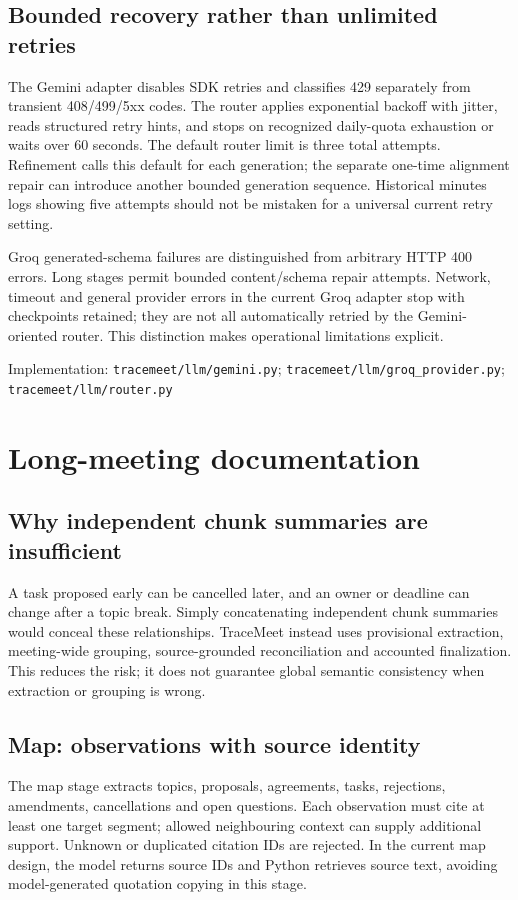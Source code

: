 \documentclass[11pt,a4paper]{article}
\newcommand{\code}[1]{\nolinkurl{#1}}
\newcommand{\src}[1]{\par{\footnotesize\raggedright\textcolor{accent}{Implementation:} #1\par}}
\begin{document}
\subsection{Bounded recovery rather than unlimited retries}
The Gemini adapter disables SDK retries and classifies 429 separately from transient 408/499/5xx codes. The router applies exponential backoff with jitter, reads structured retry hints, and stops on recognized daily-quota exhaustion or waits over 60 seconds. The default router limit is three total attempts. Refinement calls this default for each generation; the separate one-time alignment repair can introduce another bounded generation sequence. Historical minutes logs showing five attempts should not be mistaken for a universal current retry setting.

Groq generated-schema failures are distinguished from arbitrary HTTP 400 errors. Long stages permit bounded content/schema repair attempts. Network, timeout and general provider errors in the current Groq adapter stop with checkpoints retained; they are not all automatically retried by the Gemini-oriented router. This distinction makes operational limitations explicit.
\src{\code{tracemeet/llm/gemini.py}; \code{tracemeet/llm/groq_provider.py}; \code{tracemeet/llm/router.py}}

\section{Long-meeting documentation}
\subsection{Why independent chunk summaries are insufficient}
A task proposed early can be cancelled later, and an owner or deadline can change after a topic break. Simply concatenating independent chunk summaries would conceal these relationships. TraceMeet instead uses provisional extraction, meeting-wide grouping, source-grounded reconciliation and accounted finalization. This reduces the risk; it does not guarantee global semantic consistency when extraction or grouping is wrong.

\subsection{Map: observations with source identity}
The map stage extracts topics, proposals, agreements, tasks, rejections, amendments, cancellations and open questions. Each observation must cite at least one target segment; allowed neighbouring context can supply additional support. Unknown or duplicated citation IDs are rejected. In the current map design, the model returns source IDs and Python retrieves source text, avoiding model-generated quotation copying in this stage.
\end{document}
